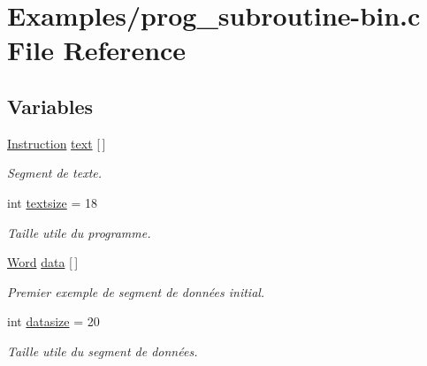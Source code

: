 \hypertarget{prog__subroutine-bin_8c}{\section{\-Examples/prog\-\_\-subroutine-\/bin.c \-File \-Reference}
\label{prog__subroutine-bin_8c}
}
\subsection*{\-Variables}
\begin{DoxyCompactItemize}
\item 
\hyperlink{union_instruction}{\-Instruction} \hyperlink{prog__subroutine-bin_8c_a53ae7c86b11d9a664628491ba41ca09d}{text} \mbox{[}$\,$\mbox{]}
\begin{DoxyCompactList}\small\item\em \-Segment de texte. \end{DoxyCompactList}\item 
int \hyperlink{prog__subroutine-bin_8c_a09c9805cec0364d715497e6564245c48}{textsize} = 18
\begin{DoxyCompactList}\small\item\em \-Taille utile du programme. \end{DoxyCompactList}\item 
\hyperlink{instruction_8h_a0b5b15ce5f3a75b5dd0de6643cd3d958}{\-Word} \hyperlink{prog__subroutine-bin_8c_a0a1a7765b8d407ad9c19649d5a9dd699}{data} \mbox{[}$\,$\mbox{]}
\begin{DoxyCompactList}\small\item\em \-Premier exemple de segment de données initial. \end{DoxyCompactList}\item 
int \hyperlink{prog__subroutine-bin_8c_a5c7949e884a8b9b3d1ab9f070267bf33}{datasize} = 20
\begin{DoxyCompactList}\small\item\em \-Taille utile du segment de données. \end{DoxyCompactList}\end{DoxyCompactItemize}


